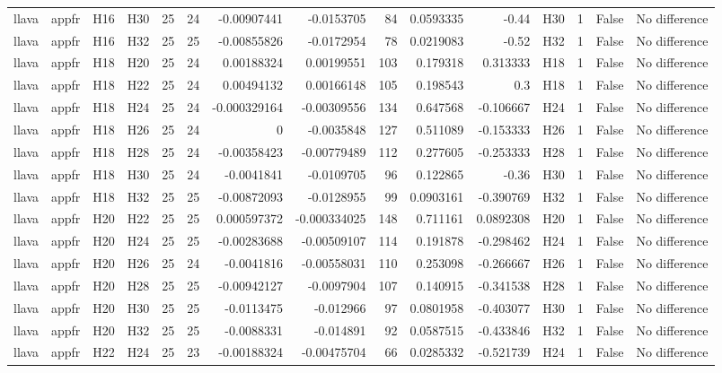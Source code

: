\begin{longtable}{llllrrrrrrrlrrl}
llava & appfr & H16 & H30 & 25 & 24 & -0.00907441 & -0.0153705 & 84 & 0.0593335 & -0.44 & H30 & 1 & False & No difference \\
llava & appfr & H16 & H32 & 25 & 25 & -0.00855826 & -0.0172954 & 78 & 0.0219083 & -0.52 & H32 & 1 & False & No difference \\
llava & appfr & H18 & H20 & 25 & 24 & 0.00188324 & 0.00199551 & 103 & 0.179318 & 0.313333 & H18 & 1 & False & No difference \\
llava & appfr & H18 & H22 & 25 & 24 & 0.00494132 & 0.00166148 & 105 & 0.198543 & 0.3 & H18 & 1 & False & No difference \\
llava & appfr & H18 & H24 & 25 & 24 & -0.000329164 & -0.00309556 & 134 & 0.647568 & -0.106667 & H24 & 1 & False & No difference \\
llava & appfr & H18 & H26 & 25 & 24 & 0 & -0.0035848 & 127 & 0.511089 & -0.153333 & H26 & 1 & False & No difference \\
llava & appfr & H18 & H28 & 25 & 24 & -0.00358423 & -0.00779489 & 112 & 0.277605 & -0.253333 & H28 & 1 & False & No difference \\
llava & appfr & H18 & H30 & 25 & 24 & -0.0041841 & -0.0109705 & 96 & 0.122865 & -0.36 & H30 & 1 & False & No difference \\
llava & appfr & H18 & H32 & 25 & 25 & -0.00872093 & -0.0128955 & 99 & 0.0903161 & -0.390769 & H32 & 1 & False & No difference \\
llava & appfr & H20 & H22 & 25 & 25 & 0.000597372 & -0.000334025 & 148 & 0.711161 & 0.0892308 & H20 & 1 & False & No difference \\
llava & appfr & H20 & H24 & 25 & 25 & -0.00283688 & -0.00509107 & 114 & 0.191878 & -0.298462 & H24 & 1 & False & No difference \\
llava & appfr & H20 & H26 & 25 & 24 & -0.0041816 & -0.00558031 & 110 & 0.253098 & -0.266667 & H26 & 1 & False & No difference \\
llava & appfr & H20 & H28 & 25 & 25 & -0.00942127 & -0.0097904 & 107 & 0.140915 & -0.341538 & H28 & 1 & False & No difference \\
llava & appfr & H20 & H30 & 25 & 25 & -0.0113475 & -0.012966 & 97 & 0.0801958 & -0.403077 & H30 & 1 & False & No difference \\
llava & appfr & H20 & H32 & 25 & 25 & -0.0088331 & -0.014891 & 92 & 0.0587515 & -0.433846 & H32 & 1 & False & No difference \\
llava & appfr & H22 & H24 & 25 & 23 & -0.00188324 & -0.00475704 & 66 & 0.0285332 & -0.521739 & H24 & 1 & False & No difference \\

\end{longtable}
